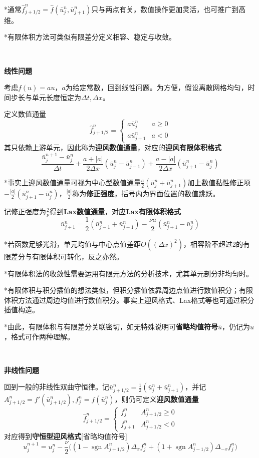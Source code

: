 \documentclass[a4paper,UTF8,fontset=windows]{ctexart}
\DeclareMathOperator{\sgn}{sgn}
\begin{document}
*通常$\hat{f}_{j+1/2}^n=\hat{f}(\bar{u}_j^n,\bar{u}_{j+1}^n)$只与两点有关，数值操作更加灵活，也可推广到高维。

*有限体积方法可类似有限差分定义相容、稳定与收敛。

\

\textbf{线性问题}

考虑$f(u)=au$，$a$为给定常数，回到线性问题。为方便，假设离散网格均匀，时间步长与单元长度恒定为$\Delta t,\Delta x$。

定义数值通量
$$\hat{f}_{j+1/2}^n=\begin{cases}a\bar{u}_j^n&a\ge0\\a\bar{u}_{j+1}^n&a<0\end{cases}$$
其只依赖上游单元，因此称为\textbf{迎风数值通量}，对应的\textbf{迎风有限体积格式}
$$\frac{\bar{u}_j^{n+1}-\bar{u}_j^n}{\Delta t}+\frac{a+|a|}{2\Delta x}(\bar{u}_j^n-\bar{u}_{j-1}^n)+\frac{a-|a|}{2\Delta x}(\bar{u}_{j+1}^n-\bar{u}_j^n)$$

*事实上迎风数值通量可视为中心型数值通量$\frac{a}{2}(\bar{u}_j^n+\bar{u}_{j+1}^n)$加上数值黏性修正项$-\frac{|a|}{2}(\bar{u}_{j+1}^n-\bar{u}_j^n)$，$\frac{|a|}{2}$称为\textbf{修正强度}，括号内为界面位置的数值跳跃。

记修正强度为$\frac{2}{\nu}$得到\textbf{Lax数值通量}，对应\textbf{Lax有限体积格式}
$$\bar{u}_{j+1}^n=\frac{1}{2}(\bar{u}_{j-1}^n+\bar{u}_{j+1}^n)-\frac{\nu a}{2}(\bar{u}_{j+1}^n-\bar{u}_j^n)$$

*若函数足够光滑，单元均值与中心点值差距$O((\Delta x)^2)$，相容阶不超过2的有限差分与有限体积可转化，反之亦然。

*有限体积法的收敛性需要运用有限元方法的分析技术，尤其单元剖分非均匀时。

*有限体积与积分插值的想法类似，但积分插值依靠周边点值进行数值积分；有限体积方法通过周边均值进行数值积分。事实上迎风格式、Lax格式等也可通过积分插值构造。

*由此，有限体积与有限差分关联密切，如无特殊说明可\textbf{省略均值符号}$\bar{u}$，仍记为$u$，格式可作两种理解。

\

\textbf{非线性问题}

回到一般的非线性双曲守恒律。记$\bar{u}_{j+1/2}^n=\frac{1}{2}(\bar{u}_j^n+\bar{u}_{j+1}^n)$，并记$A_{j+1/2}^n=f'(\bar{u}_{j+1/2}^n),f_j^n=f(\bar{u}_j^n)$，则仍可定义\textbf{迎风数值通量}
$$\hat{f}_{j+1/2}^n=\begin{cases}f_j^n&A_{j+1/2}^n\ge0\\f_{j+1}^n&A_{j+1/2}^n<0\end{cases}$$
对应得到\textbf{守恒型迎风格式}[省略均值符号]
$$u_j^{n+1}=u_j^n-\frac{\nu}{2}\big((1-\sgn A_{j+1/2}^n)\Delta_xf_j^n+(1+\sgn A_{j-1/2}^n)\Delta_{-x}f_j^n\big)$$
\end{document}
